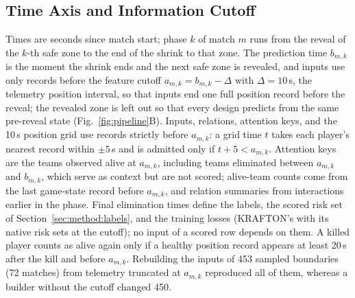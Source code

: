 \documentclass[sigconf,anonymous]{acmart}
\begin{document}
\subsection{Time Axis and Information Cutoff}
\label{sec:method:samples}
Times are seconds since match start; phase $k$ of match $m$ runs from the reveal of the $k$-th safe zone to the end of the shrink to that zone. The prediction time $b_{m,k}$ is the moment the shrink ends and the next safe zone is revealed, and inputs use only records before the feature cutoff $a_{m,k}=b_{m,k}-\Delta$ with $\Delta=10$\,s, the telemetry position interval, so that inputs end one full position record before the reveal; the revealed zone is left out so that every design predicts from the same pre-reveal state (Fig.~\ref{fig:pipeline}B). Inputs, relations, attention keys, and the 10\,s position grid use records strictly before $a_{m,k}$: a grid time $t$ takes each player's nearest record within $\pm5$\,s and is admitted only if $t+5<a_{m,k}$. Attention keys are the teams observed alive at $a_{m,k}$, including teams eliminated between $a_{m,k}$ and $b_{m,k}$, which serve as context but are not scored; alive-team counts come from the last game-state record before $a_{m,k}$, and relation summaries from interactions earlier in the phase. Final elimination times define the labels, the scored risk set of Section~\ref{sec:method:labels}, and the training losses (KRAFTON's with its native risk sets at the cutoff); no input of a scored row depends on them. A killed player counts as alive again only if a healthy position record appears at least 20\,s after the kill and before $a_{m,k}$. Rebuilding the inputs of 453 sampled boundaries (72 matches) from telemetry truncated at $a_{m,k}$ reproduced all of them, whereas a builder without the cutoff changed 450.
\end{document}
